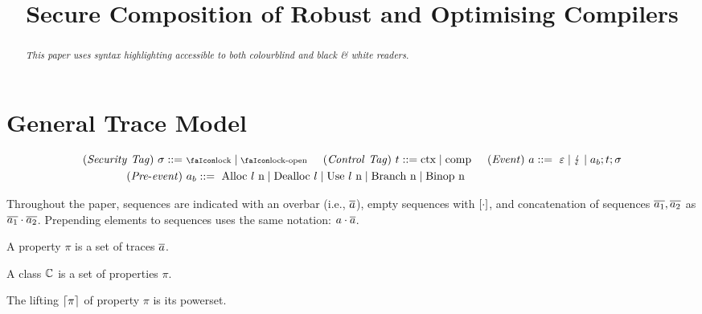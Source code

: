 \documentclass[utf8,acmsmall,review,screen,dvipsnames]{acmart}
\begin{document}
\title{Secure Composition of Robust and Optimising Compilers}
\begin{abstract}
\begin{center}\small\it
	{This paper uses syntax highlighting accessible to both colourblind and black \& white readers.
	}
\end{center}
\end{abstract}

\maketitle

\appendix

\section{General Trace Model}\label{ap:def:gtm}

\begin{gather*}
  \begin{aligned}
  \mi{(Security\ Tag)}~\sigma\bnfdef&\ \lock \mid \unlock\hspace{0.5cm}
  \mi{(Control\ Tag)}~\sandboxtag\bnfdef \ctx\mid\comp\hspace{0.5cm}
  \mi{(Event)}~\event\bnfdef\ \emptyevent \mid \lightning \mid \event[_{b}];\sandboxtag;\sigma \\
  \mi{(Pre\text{-}event)}&~\event[_{b}]\bnfdef\ \ev{Alloc\ \loc\ n} \mid \ev{Dealloc\ \loc} \mid \ev{Use\ \loc\ n} \mid \ev{Branch\ n} \mid \ev{Binop\ n} \\
  \end{aligned}
\end{gather*}

Throughout the paper, sequences are indicated with an overbar (i.e., $\trace$), empty sequences with $\hole{\cdot}$, and concatenation of sequences $\trace[_{1}],\trace[_{2}]$ as $\trace[_{1}]\cdot\trace[_{2}]$.
Prepending elements to sequences uses the same notation: $\event\cdot\trace$.

\begin{definition}\label{ap:def:property}
  A property $\pi$ is a set of traces $\trace$.
\end{definition}
\begin{definition}\label{ap:def:propclass}
  A class $\class$ is a set of properties $\pi$.
\end{definition}
\begin{definition}\label{ap:def:lifting:properties}
  The lifting $\lift{\pi}$ of property $\pi$ is its powerset.
\end{definition}
\end{document}
